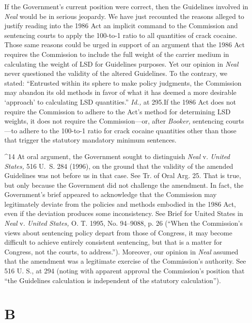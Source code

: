 {{  If the Government's current position were correct, then the
Guidelines involved in \emph{Neal} would be in serious jeopardy. We have
just recounted the reasons alleged to justify reading into the 1986 Act
an implicit command to the Commission and sentencing courts to apply the
100-to-1 ratio to all quantities of crack cocaine. Those same reasons
could be urged in support of an argument that the 1986 Act requires
the Commission to include the full weight of the carrier medium in
calculating the weight of LSD for Guidelines purposes. Yet our opinion
in \emph{Neal} never questioned the validity of the altered Guidelines.
To the contrary, we stated: ``Entrusted within its sphere to make
policy judgments, the Commission may abandon its old methods in favor
of what it has deemed a more desirable ‘approach' to calculating
LSD quantities.'' \emph{Id.,} at 295.\footnotemark[14] If the 1986 Act does
not require the Commis\newpage sion to adhere to the Act's method for
determining LSD weights, it does not require the Commission---or, after
\emph{Booker,} sentencing courts---to adhere to the 100-to-1 ratio for
crack cocaine quantities other than those that trigger the statutory
mandatory minimum sentences.


^14 At oral argument, the Government sought to distinguish \emph{Neal}
v. \emph{United States,} 516 U.~S. 284 (1996), on the ground that the
validity of the amended Guidelines was not before us in that case. See
Tr. of Oral Arg. 25. That is true, but only because the Government did
not challenge the amendment. In fact, the Government's brief appeared
to acknowledge that the Commission may legitimately deviate from the
policies and methods embodied in the 1986 Act, even if the deviation
produces some inconsistency. See Brief for United States in \emph{Neal}
v. \emph{United States,} O. T. 1995, No. 94--9088, p. 26 (``When the
Commission's views about sentencing \newpage  policy depart from those
of Congress, it may become difficult to achieve entirely consistent
sentencing, but that is a matter for Congress, not the courts, to
address.''). Moreover, our opinion in \emph{Neal} assumed that the
amendment was a legitimate exercise of the Commission's authority.
See 516 U. S., at 294 (noting with apparent approval the Commission's
position that ``the Guidelines calculation is independent of the
statutory calculation'').

\section{B}

}}
